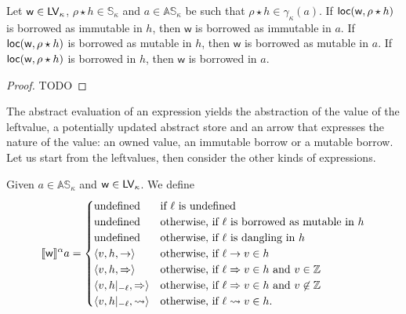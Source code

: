 \begin{proposition}
  \label{prop:abstract_borrow_correctness}
  Let $\mathsf{w}\in\Leftvalues_\kappa$, $\rho\star h\in\mathbb{S}_\kappa$
  and $a\in\mathbb{AS}_\kappa$ be
  such that $\rho\star h\in\gamma_\kappa(a)$.
  If $\loc(\mathsf{w},\rho\star h)$ is borrowed as immutable in $h$, then
  $\mathsf{w}$ is borrowed as immutable in $a$.
  If $\loc(\mathsf{w},\rho\star h)$ is borrowed as mutable in $h$, then
  $\mathsf{w}$ is borrowed as mutable in $a$.
  If $\loc(\mathsf{w},\rho\star h)$ is borrowed in $h$, then
  $\mathsf{w}$ is borrowed in $a$.  
\end{proposition}
\begin{proof}
  TODO
\end{proof}

The abstract evaluation of an expression yields the abstraction of the
value of the leftvalue, a potentially updated abstract store
and an arrow that expresses the nature of the value: an owned value, an immutable borrow
or a mutable borrow. Let us start from the leftvalues, then consider the other kinds of
expressions.

\begin{definition}\label{def:abstract_semantics_leftvalues}
  Given $a\in\mathbb{AS}_\kappa$ and $\mathsf{w}\in\Leftvalues_\kappa$.
  We define
  \[
  \dena[\mathsf{w}]{a}=\begin{cases}
  \text{undefined} & \text{if $\ell$ is undefined}\\
  \text{undefined} & \text{otherwise, if $\ell$ is borrowed as mutable in $h$}\\
  \text{undefined} & \text{otherwise, if $\ell$ is dangling in $h$}\\
  \langle v, h, \to\rangle & \text{otherwise, if $\ell\to v\in h$}\\
  \langle v, h, \Rightarrow\rangle & \text{otherwise, if $\ell\Rightarrow v\in h$ and $v\in\mathbb{Z}$}\\
  \langle v, h|_{-\ell}, \Rightarrow\rangle & \text{otherwise, if $\ell\Rightarrow v\in h$ and $v\not\in\mathbb{Z}$}\\
  \langle v, h|_{-\ell}, \leadsto\rangle & \text{otherwise, if $\ell\leadsto v\in h$.}\\
  \end{cases}
  \]
\end{definition}
